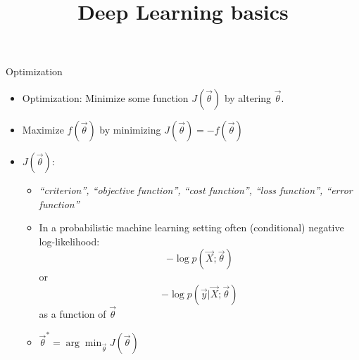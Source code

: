 



\newcommand{\learninggoals}{
\item Recall the concept of optimization
\item Understand basics of gradient descent}

\title{Deep Learning basics}
\date{}




\begin{vbframe}{Optimization}

\vfill

\begin{itemize}
\item Optimization: Minimize some function $J(\vec \theta)$ by altering $\vec \theta$.
\item Maximize $f(\vec \theta)$ by minimizing $J(\vec \theta) = - f(\vec \theta)$
\item $J(\vec \theta)$:
\begin{itemize}
 \item \emph{``criterion'', ``objective function'', ``cost function'', ``loss function'', ``error function''}
 \item In a probabilistic machine learning setting often (conditional) negative log-likelihood:
 $$- \log p(\vec X; \vec \theta)$$
 or
 $$- \log p(\vec y|\vec X; \vec \theta)$$
 as a function of $\vec \theta$
\item $\vec \theta^* = \arg\min_{\vec\theta} J(\vec \theta)$

\end{itemize}
\end{itemize}
\begin{center}
\end{center}

\vfill

\end{vbframe}



